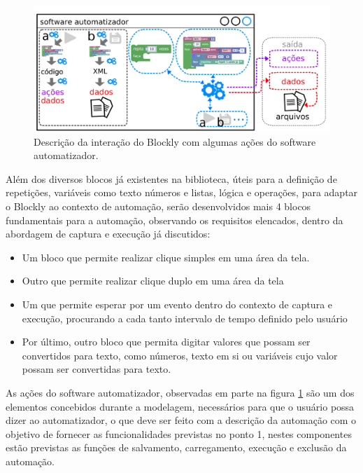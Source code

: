\documentclass[tg]{mdtufsm}
\begin{document}
                \begin{figure}[!htb]
                    {\centering
                    \includegraphics[width=1.0\textwidth]{imagens/blocklyDiagram.png}
                    \caption{Descrição da interação do Blockly com algumas ações do software automatizador.}
                    \label{fig:BlocklyDiagram}}
                \end{figure}

                Além dos diversos blocos já existentes na biblioteca, úteis para a definição de repetições, variáveis como texto números e listas, lógica e operações, para adaptar o Blockly ao contexto de automação, serão desenvolvidos mais 4 blocos fundamentais para a automação, observando os requisitos elencados, dentro da abordagem de captura e execução já discutidos:

                \begin{itemize}
                    \item Um bloco que permite realizar clique simples em uma área da tela.
                    \item Outro que permite realizar clique duplo em uma área da tela
                    \item Um que permite esperar por um evento dentro do contexto de captura e execução, procurando a cada tanto intervalo de tempo definido pelo usuário
                    \item Por último, outro bloco que permita digitar valores que possam ser convertidos para texto, como números, texto em si ou variáveis cujo valor possam ser convertidas para texto.
                \end{itemize}

                As ações do software automatizador, observadas em parte na figura \ref{fig:BlocklyDiagram} são um dos elementos concebidos durante a modelagem, necessários para que o usuário possa dizer ao automatizador, o que deve ser feito com a descrição da automação com o objetivo de fornecer as funcionalidades previstas no ponto 1, nestes componentes estão previstas as funções de salvamento, carregamento, execução e exclusão da automação.
\end{document}
